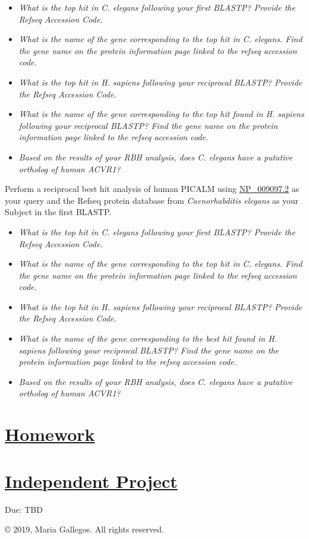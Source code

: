 \documentclass[
]{book}
\providecommand{\tightlist}{%
  \setlength{\itemsep}{0pt}\setlength{\parskip}{0pt}}
\begin{document}
\begin{itemize}
\tightlist
\item
  \emph{What is the top hit in C. elegans following your first BLASTP? Provide the Refseq Accession Code.}
\item
  \emph{What is the name of the gene corresponding to the top hit in C. elegans. Find the gene name on the protein information page linked to the refseq accession code.}
\item
  \emph{What is the top hit in H. sapiens following your reciprocal BLASTP? Provide the Refseq Accession Code.}
\item
  \emph{What is the name of the gene corresponding to the top hit found in H. sapiens following your reciprocal BLASTP? Find the gene name on the protein information page linked to the refseq accession code.}
\item
  \emph{Based on the results of your RBH analysis, does C. elegans have a putative ortholog of human ACVR1?}
\end{itemize}

Perform a reciprocal best hit analysis of human PICALM using \href{https://www.ncbi.nlm.nih.gov/protein/NP_009097.2}{NP\_009097.2} as your query and the Refseq protein database from \emph{Caenorhabditis elegans} as your Subject in the first BLASTP.

\begin{itemize}
\tightlist
\item
  \emph{What is the top hit in C. elegans following your first BLASTP? Provide the Refseq Accession Code.}
\item
  \emph{What is the name of the gene corresponding to the top hit in C. elegans. Find the gene name on the protein information page linked to the refseq accession code.}
\item
  \emph{What is the top hit in H. sapiens following your reciprocal BLASTP? Provide the Refseq Accession Code.}
\item
  \emph{What is the name of the gene corresponding to the best hit found in H. sapiens following your reciprocal BLASTP? Find the gene name on the protein information page linked to the refseq accession code.}
\item
  \emph{Based on the results of your RBH analysis, does C. elegans have a putative ortholog of human ACVR1?}
\end{itemize}

\hypertarget{homework-2}{%
\section{\texorpdfstring{\href{https://drive.google.com/file/d/1CWf927mnP3droqocuIpVahigShlSgt6R/view?usp=sharing}{Homework}}{Homework}}\label{homework-2}}

\hypertarget{independent-project}{%
\section{\texorpdfstring{\href{https://drive.google.com/file/d/1uDrvFGWak0VfqcvS_N6fbTqZ_-hIk7Y1/view?usp=sharing}{Independent Project}}{Independent Project}}\label{independent-project}}

Due: TBD

© 2019, Maria Gallegos. All rights reserved.
\end{document}
